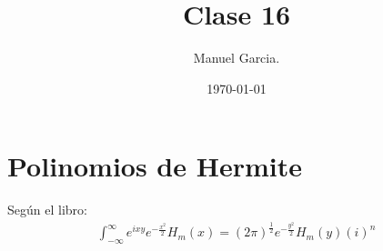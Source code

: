 \documentclass{article}
\title{Clase 16}
\author{Manuel Garcia.}
\date{\today}
\begin{document}
\maketitle

\section{Polinomios de Hermite }
Según el libro:
\begin{gather*}
  \displaystyle\int_{- \infty}^{\infty}e ^ {i x y } e ^ {- \frac{x^2 }{2}}H_m(x ) = (2\pi )^ {\frac{1}{2}} e ^ {- \frac{y^2 }{2 }}H_m(y) (i)^n  
\end{gather*}
\end{document}
